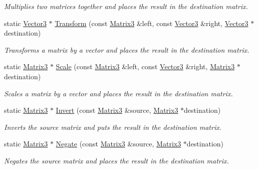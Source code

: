 \begin{DoxyCompactItemize}
\begin{DoxyCompactList}\small\item\em Multiplies two matrices together and places the result in the destination matrix. \end{DoxyCompactList}\item 
static \hyperlink{class_flounder_1_1_vector3}{Vector3} $\ast$ \hyperlink{class_flounder_1_1_matrix3_ac2838df63db7302884621cea4ee7442c}{Transform} (const \hyperlink{class_flounder_1_1_matrix3}{Matrix3} \&left, const \hyperlink{class_flounder_1_1_vector3}{Vector3} \&right, \hyperlink{class_flounder_1_1_vector3}{Vector3} $\ast$destination)
\begin{DoxyCompactList}\small\item\em Transforms a matrix by a vector and places the result in the destination matrix. \end{DoxyCompactList}\item 
static \hyperlink{class_flounder_1_1_matrix3}{Matrix3} $\ast$ \hyperlink{class_flounder_1_1_matrix3_a0f3a006f680f9f92510655018229b22c}{Scale} (const \hyperlink{class_flounder_1_1_matrix3}{Matrix3} \&left, const \hyperlink{class_flounder_1_1_vector3}{Vector3} \&right, \hyperlink{class_flounder_1_1_matrix3}{Matrix3} $\ast$destination)
\begin{DoxyCompactList}\small\item\em Scales a matrix by a vector and places the result in the destination matrix. \end{DoxyCompactList}\item 
static \hyperlink{class_flounder_1_1_matrix3}{Matrix3} $\ast$ \hyperlink{class_flounder_1_1_matrix3_a3de5777d7335099b54c892c714efb876}{Invert} (const \hyperlink{class_flounder_1_1_matrix3}{Matrix3} \&source, \hyperlink{class_flounder_1_1_matrix3}{Matrix3} $\ast$destination)
\begin{DoxyCompactList}\small\item\em Inverts the source matrix and puts the result in the destination matrix. \end{DoxyCompactList}\item 
static \hyperlink{class_flounder_1_1_matrix3}{Matrix3} $\ast$ \hyperlink{class_flounder_1_1_matrix3_adf2c9f890c43576b8280917ec430ca16}{Negate} (const \hyperlink{class_flounder_1_1_matrix3}{Matrix3} \&source, \hyperlink{class_flounder_1_1_matrix3}{Matrix3} $\ast$destination)
\begin{DoxyCompactList}\small\item\em Negates the source matrix and places the result in the destination matrix. \end{DoxyCompactList}\item 

\end{DoxyCompactItemize}
